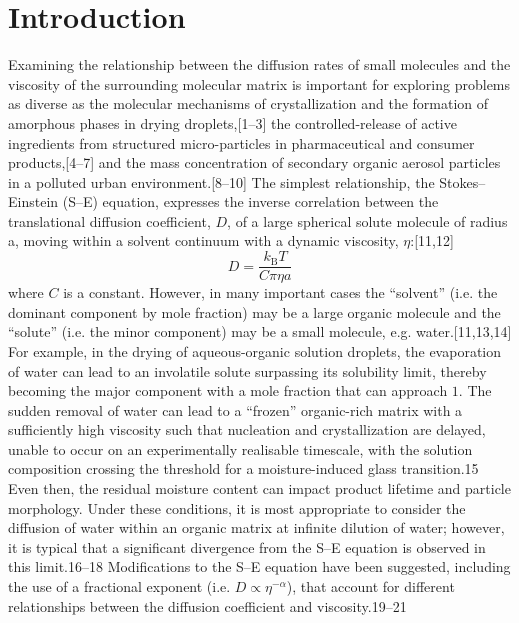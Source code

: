 \section{Introduction}
Examining the relationship between the diffusion rates of small molecules and the viscosity of the surrounding molecular matrix is important for exploring problems as diverse as the molecular mechanisms of crystallization and the formation of amorphous phases in drying droplets,[1–3] the controlled-release of active ingredients from structured micro-particles in pharmaceutical and consumer products,[4–7] and the mass concentration of secondary organic aerosol particles in a polluted urban environment.[8–10] The simplest relationship, the Stokes–Einstein (S–E) equation, expresses the inverse correlation between the translational diffusion coefficient, $D$, of a large spherical solute molecule of radius a, moving within a solvent continuum with a dynamic viscosity, $\eta$:[11,12]
\begin{equation}\label{eqn:diffusion}
D=\frac{k_{\mathrm{B}} T}{C \pi \eta a}
\end{equation}
where $C$ is a constant. However, in many important cases the ``solvent” (i.e. the dominant component by mole fraction) may be a large organic molecule and the ``solute” (i.e. the minor component) may be a small molecule, e.g. water.[11,13,14] For example, in the drying of aqueous-organic solution droplets, the evaporation of water can lead to an involatile solute surpassing its solubility limit, thereby becoming the major component with a mole fraction that can approach $1$. The sudden removal of water can lead to a “frozen” organic-rich matrix with a sufficiently high viscosity such that nucleation and crystallization are delayed, unable to occur on an experimentally realisable timescale, with the solution composition crossing the threshold for a moisture-induced glass transition.15 Even then, the residual moisture content can impact product lifetime and particle morphology. Under these conditions, it is most appropriate to consider the diffusion of water within an organic matrix at infinite dilution of water; however, it is typical that a significant divergence from the S–E equation is observed in this limit.16–18 Modifications to the S–E equation have been suggested, including the use of a fractional exponent (i.e. $D \propto \eta^{-\alpha}$), that account for different relationships between the diffusion coefficient and viscosity.19–21

